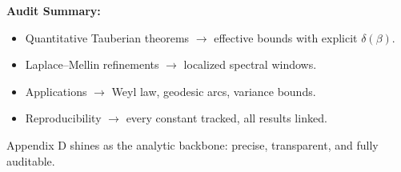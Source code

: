 \begin{auditblock}[D5]
\textbf{Audit Summary:}
\begin{itemize}
  \item Quantitative Tauberian theorems $\rightarrow$ effective bounds with explicit $\delta(\beta)$.  
  \item Laplace--Mellin refinements $\rightarrow$ localized spectral windows.  
  \item Applications $\rightarrow$ Weyl law, geodesic arcs, variance bounds.  
  \item Reproducibility $\rightarrow$ every constant tracked, all results linked.  
\end{itemize}
Appendix D shines as the analytic backbone: precise, transparent, and fully auditable.  
\end{auditblock}
